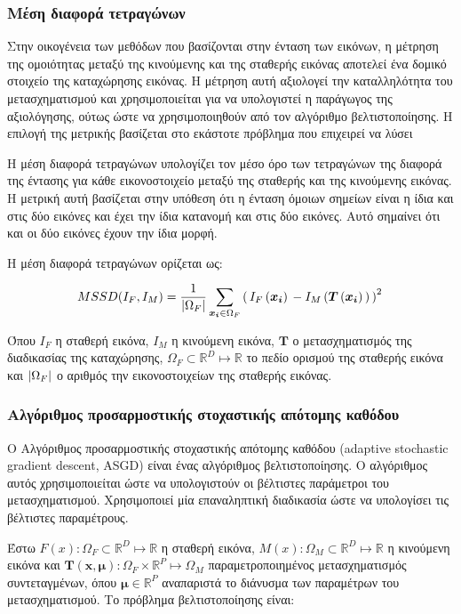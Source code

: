 \documentclass[a4paper,12pt]{article}
\DeclarePairedDelimiter\abs{\lvert}{\rvert}%
\newcommand{\R}{\mathbb{R}}
\begin{document}
\subsubsection{Μέση διαφορά τετραγώνων} \label{MSSD}

Στην οικογένεια των μεθόδων που βασίζονται στην ένταση των εικόνων, η μέτρηση
της ομοιότητας μεταξύ της κινούμενης και της σταθερής εικόνας αποτελεί ένα
δομικό στοιχείο της καταχώρησης εικόνας. Η μέτρηση αυτή αξιολογεί την
καταλληλότητα του μετασχηματισμού και χρησιμοποιείται για να υπολογιστεί η
παράγωγος της αξιολόγησης, ούτως ώστε να χρησιμοποιηθούν από τον αλγόριθμο
βελτιστοποίησης. Η επιλογή της μετρικής βασίζεται στο εκάστοτε πρόβλημα που
επιχειρεί να λύσει

Η μέση διαφορά τετραγώνων υπολογίζει τον μέσο όρο των τετραγώνων της διαφορά της
έντασης για κάθε εικονοστοιχείο μεταξύ της σταθερής και της κινούμενης εικόνας.
Η μετρική αυτή βασίζεται στην υπόθεση ότι η ένταση όμοιων σημείων είναι η ίδια
και στις δύο εικόνες και έχει την ίδια κατανομή και στις δύο εικόνες. Αυτό
σημαίνει ότι και οι δύο εικόνες έχουν την ίδια μορφή. 

Η μέση διαφορά τετραγώνων ορίζεται ως:

\begin{equation*}
    MSSD(I_F, I_M) = \frac {1} {\abs{\Omega_F}} \sum_{\bm{x_i} \in \Omega_F} 
        \left(\, {I_F\left(\bm{x_i}\right)\, - 
                  I_M\left(\bm{T}\left(\bm{x_i}\right)\,\right)\,}
        \right)^2\, 
\end{equation*}

Όπου $I_F$ η σταθερή εικόνα, $I_M$ η κινούμενη εικόνα, $\bm{T}$ ο
μετασχηματισμός της διαδικασίας της καταχώρησης, $\Omega_F \subset \R^D \mapsto
\R$ το πεδίο ορισμού της σταθερής εικόνα και $\abs{\Omega_F}$ ο αριθμός την
εικονοστοιχείων της σταθερής εικόνας.


\subsubsection{Αλγόριθμος προσαρμοστικής στοχαστικής απότομης καθόδου}

Ο Αλγόριθμος προσαρμοστικής στοχαστικής απότομης καθόδου (adaptive stochastic
gradient descent, ASGD) \cite{ASGD:1} είναι ένας αλγόριθμος βελτιστοποίησης. Ο
αλγόριθμος αυτός χρησιμοποιείται ώστε να υπολογιστούν οι βέλτιστες παράμετροι
του μετασχηματισμού. Χρησιμοποιεί μία επαναληπτική διαδικασία ώστε να υπολογίσει
τις βέλτιστες παραμέτρους.

Έστω $F(x): \Omega_F \subset \R^D \mapsto \R$ η σταθερή εικόνα, $M(x): \Omega_M
\subset \R^D \mapsto \R$ η κινούμενη εικόνα και $\bm{T(x,\mu)}: \Omega_F \times
\R^P \mapsto \Omega_M$ παραμετροποιημένος μετασχηματισμός συντεταγμένων, όπου
$\bm{\mu} \in \R^P$ αναπαριστά το διάνυσμα των παραμέτρων του μετασχηματισμού.
Το πρόβλημα βελτιστοποίησης είναι:
\end{document}
